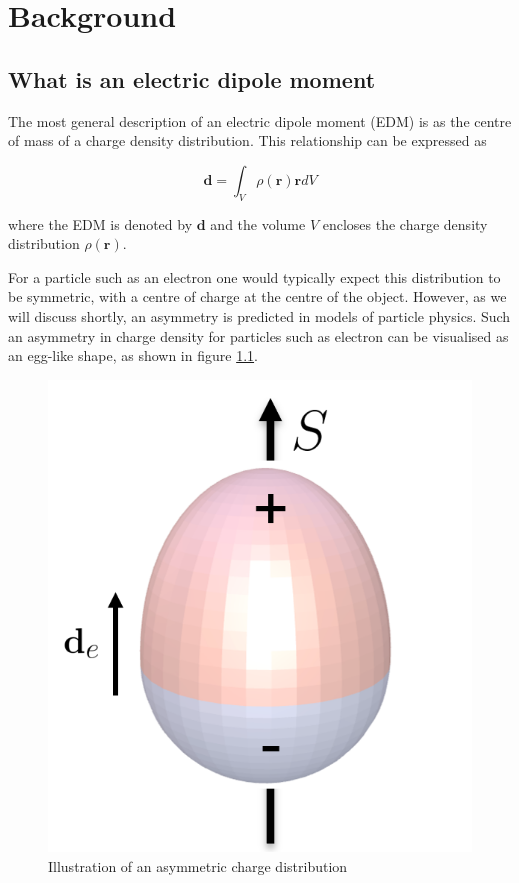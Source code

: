 \chapter{Background}
\label{background}

\section{What is an electric dipole moment}

The most general description of an electric dipole moment (EDM) is as the centre of mass of a charge density distribution. This relationship can be expressed as

\begin{equation}
    \mathbf{d} = \int_V \rho(\mathbf{r}) \mathbf{r} dV
\end{equation}

where the EDM is denoted by $\mathbf{d}$ and the volume $V$ encloses the charge density distribution $\rho(\mathbf{r})$.

For a particle such as an electron one would typically expect this distribution to be symmetric, with a centre of charge at the centre of the object. However, as we will discuss shortly, an asymmetry is predicted in models of particle physics. Such an asymmetry in charge density for particles such as electron can be visualised as an egg-like shape, as shown in figure \ref{fig:electronEdmEgg}.

\begin{figure}[!htp]
  \centering
  \includegraphics[scale=0.5]{images/EDM_egg.png}
  \caption{Illustration of an asymmetric charge distribution}
  \label{fig:electronEdmEgg}
\end{figure}

